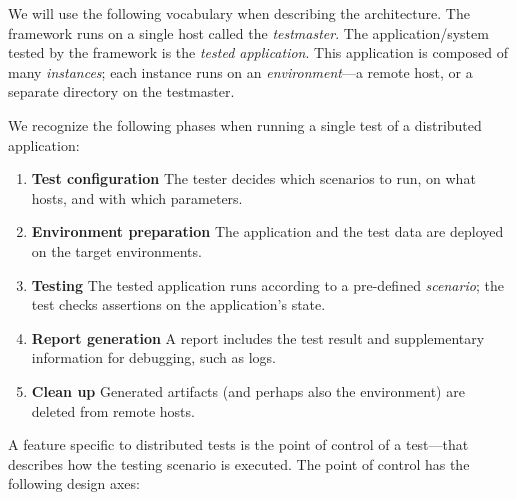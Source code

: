 We will use the following vocabulary when describing the architecture. 
The framework runs on a single host called the \emph{testmaster}.
The application/system tested by the framework is the \emph{tested application}.
This application is composed of many \emph{instances};
each instance runs on an \emph{environment}---a remote host, or a separate directory on the testmaster.

We recognize the following phases when running a single test of a distributed
application:

\begin{enumerate}
\item \textbf{Test configuration} The tester decides which scenarios to run, on what
  hosts, and with which parameters.
\item \textbf{Environment preparation} The application and the test data are deployed on the target environments.
\item \textbf{Testing} The tested application runs according to a pre-defined \emph{scenario}; the test checks assertions on the application's state.
\item \textbf{Report generation} A report includes the test
  result and supplementary information for debugging, such as logs.
\item \textbf{Clean up} Generated artifacts (and perhaps also the environment) are deleted from remote hosts.
\end{enumerate}

A feature specific to distributed tests is the point of control of a test---that
describes how the testing scenario is executed. The point of control has the
following design axes:

